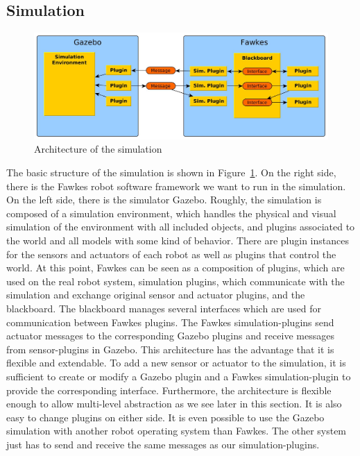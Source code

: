 \subsection{Simulation}
\label{sec:architecture_simulation}
\begin{figure}
\includegraphics[width=\textwidth]{tabs/fawkes_gazebo}
\caption{Architecture of the simulation}
\label{fig:fawkes_gazebo}
\end{figure}
The basic structure of the simulation is shown in Figure~\ref{fig:fawkes_gazebo}. On the right side, there is the Fawkes robot software framework we want to run in the simulation. On the left side, there is the simulator Gazebo. Roughly, the simulation is composed of a simulation environment, which handles the physical and visual simulation of the environment with all included objects, and plugins associated to the world and all models with some kind of behavior. There are plugin instances for the sensors and actuators of each robot as well as plugins that control the world. At this point, Fawkes can be seen as a composition of plugins, which are used on the real robot system, simulation plugins, which communicate with the simulation and exchange original sensor and actuator plugins, and the blackboard. The blackboard manages several interfaces which are used for communication between Fawkes plugins. The Fawkes simulation-plugins send actuator messages to the corresponding Gazebo plugins and receive messages from sensor-plugins in Gazebo. This architecture has the advantage that it is flexible and extendable. To add a new sensor or actuator to the simulation, it is sufficient to create or modify a Gazebo plugin and a Fawkes simulation-plugin to provide the corresponding interface. Furthermore, the architecture is flexible enough to allow multi-level abstraction as we see later in this section. It is also easy to change plugins on either side. It is even possible to use the Gazebo simulation with another robot operating system than Fawkes. The other system just has to send and receive the same messages as our simulation-plugins.


